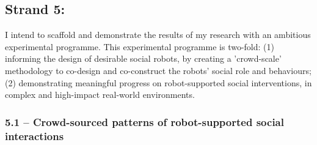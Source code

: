 % 
% 
% 
% 
% 
% 
% 
% 
% 



\subsection{Strand 5: \textbf{\wpFive}}

I intend to scaffold and demonstrate the results of my research with an
ambitious experimental programme. This experimental programme is two-fold:
(1) informing the design of desirable social robots, by creating a 'crowd-scale'
methodology to co-design and co-construct the robots' social role and
behaviours; (2) demonstrating meaningful progress on robot-supported social
interventions, in complex and high-impact real-world environments.



\subsubsection{5.1 -- Crowd-sourced patterns of robot-supported social
interactions}

